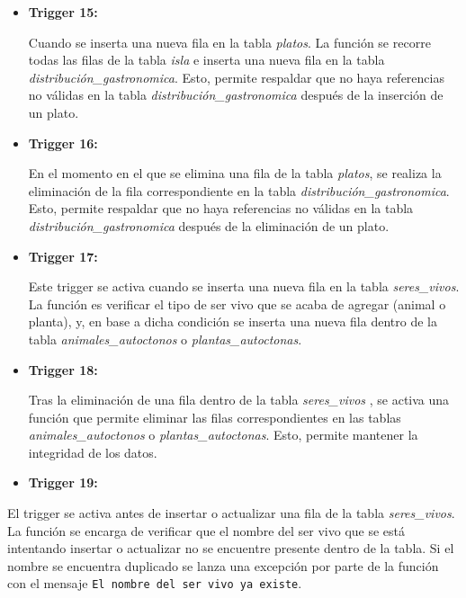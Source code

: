 \documentclass[11pt]{report}
\begin{document}
\begin{itemize}
      \item \textbf{Trigger 15:}
            \lstset{style=mystyle}
            

            Cuando se inserta una nueva fila en la tabla \emph{platos}. La función se recorre todas las filas de la tabla \emph{isla} e inserta una nueva fila en la tabla \emph{distribución\_gastronomica}. Esto, permite respaldar que no haya referencias no válidas en la tabla \emph{distribución\_gastronomica} después de la inserción de un plato.

      \item \textbf{Trigger 16:}
            \lstset{style=mystyle}
            

            En el momento en el que se elimina una fila de la tabla \emph{platos}, se realiza la eliminación de la fila correspondiente en la tabla \emph{distribución\_gastronomica}. Esto, permite respaldar que no haya referencias no válidas en la tabla \emph{distribución\_gastronomica} después de la eliminación de un plato.

      \item \textbf{Trigger 17:}
            \lstset{style=mystyle}
            

            Este trigger se activa cuando se inserta una nueva fila en la tabla \emph{seres\_vivos}. La función es verificar el tipo de ser vivo que se acaba de agregar (animal o planta), y, en base a dicha condición se inserta una nueva fila dentro de la tabla \emph{animales\_autoctonos} o \emph{plantas\_autoctonas}.

      \item \textbf{Trigger 18:}
            \lstset{style=mystyle}
            

            Tras la eliminación de una fila dentro de la tabla \emph{seres\_vivos }, se activa una función que permite eliminar las filas correspondientes en las tablas \emph{animales\_autoctonos} o \emph{plantas\_autoctonas}. Esto, permite mantener la integridad de los datos.

      \item \textbf{Trigger 19:}
            \lstset{style=mystyle}
            
\end{itemize}

El trigger se activa antes de insertar o actualizar una fila de la tabla \emph{seres\_vivos}. La función se encarga de verificar que el nombre del ser vivo que se está intentando insertar o actualizar no se encuentre presente dentro de la tabla. Si el nombre se encuentra duplicado se lanza una excepción por parte de la función con el mensaje \texttt{El nombre del ser vivo ya existe}.
\end{document}

